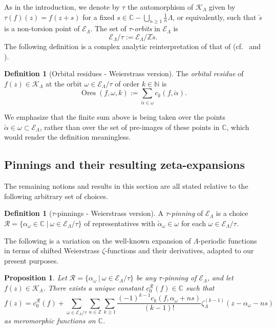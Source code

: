 \documentclass[preprint,12pt]{elsarticle}
\numberwithin{equation}{section} %
\theoremstyle{theorem}
\newtheorem{proposition}[theorem]{Proposition}
\theoremstyle{definition}
\newtheorem{definition}[theorem]{Definition}
\newcommand{\bk}{\mathcal{K}} %
\newcommand{\bkl}{\bk_{\Lambda}} %
\newcommand{\ec}{\mathcal{E}} %
\newcommand{\ecl}{\ec_{\Lambda}} %
\newcommand{\orbitl}{{\ecl/\tau}} %
\newcommand{\C}{\mathbb{C}} %
\newcommand{\zl}{\zeta_{\Lambda}}
\DeclareMathOperator{\ores}{Ores}
\begin{document}
As in the introduction, we denote by $\tau$ the automorphism of $\bkl$ given by $\tau(f)(z)=f(z+s)$ for a fixed $s\in\C-\bigcup_{n\geq 1}\frac{1}{n}\Lambda$, or equivalently, such that $\check{s}$ is a non-torsion point of $\ecl$. The set of $\tau$-\emph{orbits} in $\ecl$ is \[\orbitl:=\ecl/\mathbb{Z}\check{s}.\]
The following definition is a complex analytic reinterpretation of that of \cite[Def.~B.7]{Dreyfus2018} (cf.~\cite[Rem.~B.10]{Dreyfus2018} and \cite[Rem.~A.8]{Hardouin2021}).

\begin{definition}[Orbital residues - Weierstrass version]\label{def:oresl} The \emph{orbital residue} of $f(z)\in\bkl$ at the orbit $\omega\in\orbitl$ of order $k\in\mathbb{N}$ is \[\ores(f,\omega,k):=\sum_{\check{\alpha}\in\omega}c_k(f,\check{\alpha}).\]
\end{definition}

We emphasize that the finite sum above is being taken over the points $\check{\alpha}\in\omega\subset\ecl$, rather than over the set of pre-images of these points in $\C$, which would render the definition meaningless.

\subsection{Pinnings and their resulting zeta-expansions}

The remaining notions and results in this section are all stated relative to the following arbitrary set of choices. 

\begin{definition}[$\tau$-pinnings - Weierstrass version]\label{def:pinningl}
    A $\tau$-\emph{pinning} of $\ecl$ is a choice $\mathcal{R}=\{\alpha_\omega \in\C\ | \ \omega\in\orbitl\}$ of representatives with $\check{\alpha}_\omega\in\omega$ for each $\omega\in\orbitl$.
\end{definition}

The following is a variation on the well-known expansion of $\Lambda$-periodic functions in terms of shifted Weierstrass $\zeta$-functions and their derivatives, adapted to our present purposes.

\begin{proposition}\label{prop:zetaExp-l}
    Let $\mathcal{R}=\{\alpha_\omega \ | \ \omega\in\orbitl\}$ be any $\tau$-pinning of $\ecl$, and let $f(z)\in\bkl$. There exists a unique constant $c_0^\mathcal{R}(f)\in\mathbb{C}$ such that
    \begin{equation} \label{eq:zetaExp-l}
        f(z) = c_0^{\mathcal{R}}(f)+\sum_{\omega\in\orbitl}\sum_{n\in\mathbb{Z}}\sum_{k\geq 1}\frac{(-1)^{k-1}c_k(f,\alpha_\omega+ns)}{(k-1)!}\zl^{(k-1)}(z-\alpha_\omega-ns)
    \end{equation} as meromorphic functions on $\C$.
\end{proposition}
\end{document}
